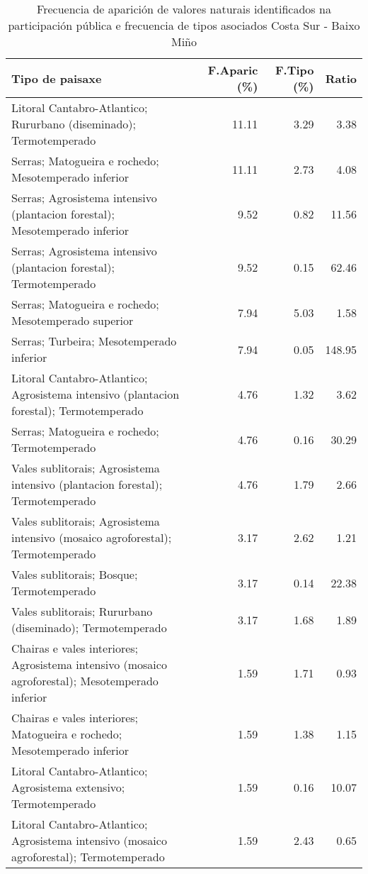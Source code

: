 \begin{table}[p]
\centering
\caption{Frecuencia de aparición de valores naturais identificados na participación pública e frecuencia de tipos asociados Costa Sur - Baixo Miño} 
\label{vsixotnat3}
\begin{tabular}{lrrr}
  \hline
Tipo de paisaxe & F.Aparic (\%) & F.Tipo (\%) & Ratio \\ 
  \hline
Litoral Cantabro-Atlantico; Rururbano (diseminado); Termotemperado & 11.11 & 3.29 & 3.38 \\ 
  Serras; Matogueira e rochedo; Mesotemperado inferior & 11.11 & 2.73 & 4.08 \\ 
  Serras; Agrosistema intensivo (plantacion forestal); Mesotemperado inferior & 9.52 & 0.82 & 11.56 \\ 
  Serras; Agrosistema intensivo (plantacion forestal); Termotemperado & 9.52 & 0.15 & 62.46 \\ 
  Serras; Matogueira e rochedo; Mesotemperado superior & 7.94 & 5.03 & 1.58 \\ 
  Serras; Turbeira; Mesotemperado inferior & 7.94 & 0.05 & 148.95 \\ 
  Litoral Cantabro-Atlantico; Agrosistema intensivo (plantacion forestal); Termotemperado & 4.76 & 1.32 & 3.62 \\ 
  Serras; Matogueira e rochedo; Termotemperado & 4.76 & 0.16 & 30.29 \\ 
  Vales sublitorais; Agrosistema intensivo (plantacion forestal); Termotemperado & 4.76 & 1.79 & 2.66 \\ 
  Vales sublitorais; Agrosistema intensivo (mosaico agroforestal); Termotemperado & 3.17 & 2.62 & 1.21 \\ 
  Vales sublitorais; Bosque; Termotemperado & 3.17 & 0.14 & 22.38 \\ 
  Vales sublitorais; Rururbano (diseminado); Termotemperado & 3.17 & 1.68 & 1.89 \\ 
  Chairas e vales interiores; Agrosistema intensivo (mosaico agroforestal); Mesotemperado inferior & 1.59 & 1.71 & 0.93 \\ 
  Chairas e vales interiores; Matogueira e rochedo; Mesotemperado inferior & 1.59 & 1.38 & 1.15 \\ 
  Litoral Cantabro-Atlantico; Agrosistema extensivo; Termotemperado & 1.59 & 0.16 & 10.07 \\ 
  Litoral Cantabro-Atlantico; Agrosistema intensivo (mosaico agroforestal); Termotemperado & 1.59 & 2.43 & 0.65 \\ 

\end{tabular}
\end{table}
